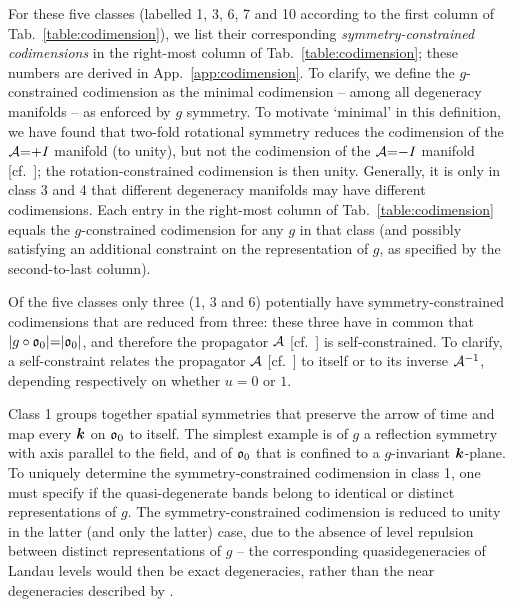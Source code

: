 \documentclass[aps, prb, showpacs, twocolumn, notitlepage, superscriptaddress]{revtex4-1}
\begin{document}
For these five classes (labelled 1, 3, 6, 7 and 10 according to the first column of Tab.\ \ref{table:codimension}), we list their corresponding \textit{symmetry-constrained codimensions} in the right-most column of Tab.\ \ref{table:codimension}; these numbers are derived in  App.\ \ref{app:codimension}. To clarify, we define the $g$-constrained codimension as the minimal codimension -- among all degeneracy manifolds -- as enforced by $g$ symmetry. To motivate `minimal' in this definition, we have found that two-fold rotational symmetry reduces the codimension of the ${\cal A}{=}{+}I$ manifold (to unity), but not the codimension of the ${\cal A}{=}{-}I$ manifold [cf.\ ]; the rotation-constrained codimension is then unity. Generally, it is only in class 3 and 4 that different  degeneracy manifolds may have different codimensions. Each entry in the right-most column of Tab.\ \ref{table:codimension} equals the $g$-constrained codimension for any $g$ in that class (and possibly satisfying an additional constraint on the representation of $g$, as specified by the second-to-last column).

Of the five classes only three (1, 3 and 6) potentially have symmetry-constrained codimensions that are reduced from three: these three have in common that  $|g\circ\mathfrak{o}_0|{=}|\mathfrak{o}_0|$, and therefore the propagator ${\cal A}$ [cf.\ ] is self-constrained. To clarify, a self-constraint relates  the propagator ${\cal A}$ [cf.\ ] to itself or to its inverse ${\cal A}^{-1}$, depending respectively on whether $u{=}0$ or $1$.  


Class 1 groups together  spatial symmetries that preserve the arrow of time and map every $\boldsymbol{k}$ on $\mathfrak{o}_0$ to itself. The simplest example is of $g$  a reflection symmetry with axis parallel to the field, and of  $\mathfrak{o}_0$ that is confined to a $g$-invariant $\boldsymbol{k}$-plane. To uniquely determine the symmetry-constrained codimension in class 1, one must specify if the quasi-degenerate bands belong to identical or distinct representations of $g$.  The symmetry-constrained codimension is reduced to unity in the latter (and only the latter) case, due to the absence of level repulsion between distinct representations of $g$ -- the corresponding quasidegeneracies of Landau levels would then be exact degeneracies, rather than the near degeneracies described by .   
\end{document}
